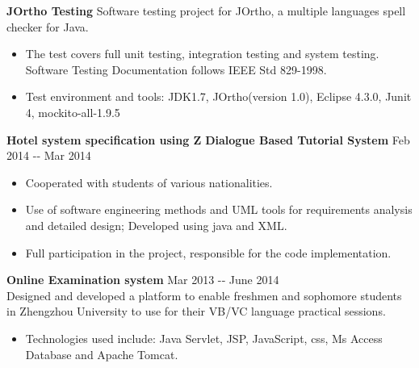 \documentclass[margin]{res}
\begin{document}
\begin{resume}
{\bf JOrtho Testing}
Software testing project for JOrtho, a multiple languages spell checker for
Java.
\begin{itemize}
  \item The test covers full
unit testing, integration testing and system testing. Software Testing
Documentation follows IEEE Std 829-1998. 
\item Test environment and tools: JDK1.7, JOrtho(version 1.0), Eclipse 4.3.0,
Junit 4, mockito-all-1.9.5
\end{itemize}
{\bf Hotel system specification using Z} 
{\bf Dialogue Based Tutorial System} \hfill Feb 2014 -­‐ Mar 2014\\

\begin{itemize}
  \item Cooperated with students of various nationalities.
  \item Use of software engineering methods and UML tools for requirements
  analysis and detailed design; Developed using java and XML.
  \item Full participation in the project, responsible for the code implementation.
\end{itemize}
{\bf Online Examination system} \hfill Mar 2013 -­‐ June 2014\\
Designed and
developed a platform to enable freshmen and sophomore students in Zhengzhou
University to use for their VB/VC language practical sessions.
\begin{itemize} 
\item Technologies used
include: Java Servlet, JSP, JavaScript, css, Ms Access Database and Apache
Tomcat.
\end{itemize}


\end{resume}
\end{document}
